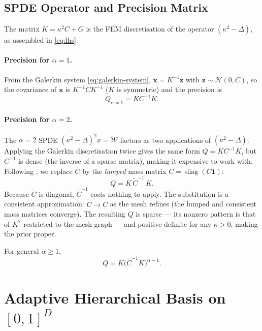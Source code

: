 \documentclass[11pt]{article}
\DeclareMathOperator{\diag}{diag}
\begin{document}
\subsection{SPDE Operator and Precision Matrix}
\label{sec:spde-op}

The matrix $K = \kappa^2 C + G$ is the FEM discretisation of the operator
$(\kappa^2 - \Delta)$, as assembled in \eqref{eq:lhs}.

\paragraph{Precision for $\alpha=1$.}
From the Galerkin system \eqref{eq:galerkin-system}, $\mathbf{x}=K^{-1}\mathbf{z}$
with $\mathbf{z}\sim\mathcal{N}(0,C)$, so the covariance of $\mathbf{x}$ is
$K^{-1}CK^{-1}$ ($K$ is symmetric) and the precision is
\begin{equation}
  Q_{\alpha=1} = K C^{-1} K.
  \label{eq:Q1}
\end{equation}

\paragraph{Precision for $\alpha=2$.}
The $\alpha=2$ SPDE $(\kappa^2-\Delta)^2 x = \mathcal{W}$ factors as two
applications of $(\kappa^2-\Delta)$.  Applying the Galerkin discretisation
twice gives the same form $Q = KC^{-1}K$, but $C^{-1}$ is dense (the inverse
of a sparse matrix), making it expensive to work with.  Following
\citet{lindgren2011}, we replace $C$ by the \emph{lumped} mass matrix
$\tilde{C}=\diag(C\mathbf{1})$:
\begin{equation}
  Q = K \, \tilde{C}^{-1} \, K.
  \label{eq:Q}
\end{equation}
Because $\tilde{C}$ is diagonal, $\tilde{C}^{-1}$ costs nothing to apply.
The substitution is a consistent approximation: $\tilde{C}\to C$ as the mesh
refines (the lumped and consistent mass matrices converge).  The resulting $Q$
is sparse --- its nonzero pattern is that of $K^2$ restricted to the mesh
graph --- and positive definite for any $\kappa>0$, making the prior proper.

For general $\alpha\ge 1$,
\begin{equation}
  Q = K\bigl(\tilde{C}^{-1}K\bigr)^{\alpha-1}.
  \label{eq:Q-general}
\end{equation}

\section{Adaptive Hierarchical Basis on $[0,1]^D$}
\label{sec:hat-tree}
\end{document}
